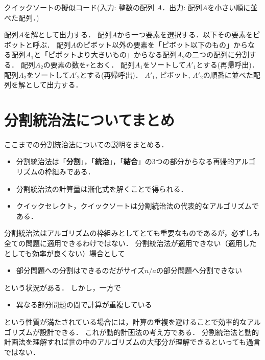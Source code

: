 \documentclass[a4paper,twoside,onecolumn,openany,article]{memoir}
\theoremstyle{remark}
\begin{document}
\begin{algorithm}
\caption{クイックソートの擬似コード(入力: 整数の配列 $A$．出力: 配列$A$を小さい順に並べた配列．)}
\label{alg:qsort}
\begin{algorithmic}
  \State 配列$A$を解として出力する．
\Else
  \State 配列$A$から一つ要素を選択する．以下その要素をピボットと呼ぶ．
  \State 配列$A$のピボット以外の要素を「ピボット以下のもの」からなる配列$A_1$と「ピボットより大きいもの」からなる配列$A_2$の二つの配列に分割する．
  \State 配列$A_2$の要素の数を$r$とおく．
  \State 配列$A_1$をソートして$A'_1$とする(再帰呼出)．
  \State 配列$A_2$をソートして$A'_2$とする(再帰呼出)．
  \State $A'_1$, ピボット, $A'_2$の順番に並べた配列を解として出力する．
\EndIf
\end{algorithmic}
\end{algorithm}

\section{分割統治法についてまとめ}
ここまでの分割統治法についての説明をまとめる．
\begin{itemize}
\item 分割統治法は「\textbf{分割}」，「\textbf{統治}」，「\textbf{結合}」の3つの部分からなる再帰的アルゴリズムの枠組みである．
\item 分割統治法の計算量は漸化式を解くことで得られる．
\item クイックセレクト，クイックソートは分割統治法の代表的なアルゴリズムである．
\end{itemize}
分割統治法はアルゴリズムの枠組みとしてとても重要なものであるが，必ずしも全ての問題に適用できるわけではない．
分割統治法が適用できない（適用したとしても効率が良くない）場合として
\begin{itemize}
\item 部分問題への分割はできるのだがサイズ$n/a$の部分問題へ分割できない
\end{itemize}
という状況がある．
しかし，一方で
\begin{itemize}
\item 異なる部分問題の間で計算が重複している
\end{itemize}
という性質が満たされている場合には，計算の重複を避けることで効率的なアルゴリズムが設計できる．
これが動的計画法の考え方である．
分割統治法と動的計画法を理解すれば世の中のアルゴリズムの大部分が理解できるといっても過言ではない．
\end{document}
